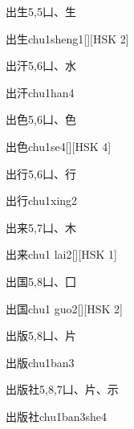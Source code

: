 \begin{entry}{出生}{5,5}{⼐、⽣}
  \begin{phonetics}{出生}{chu1sheng1}[][HSK 2]
  \end{phonetics}
\end{entry}

\begin{entry}{出汗}{5,6}{⼐、⽔}
  \begin{phonetics}{出汗}{chu1han4}
  \end{phonetics}
\end{entry}

\begin{entry}{出色}{5,6}{⼐、⾊}
  \begin{phonetics}{出色}{chu1se4}[][HSK 4]
  \end{phonetics}
\end{entry}

\begin{entry}{出行}{5,6}{⼐、⾏}
  \begin{phonetics}{出行}{chu1xing2}
  \end{phonetics}
\end{entry}

\begin{entry}{出来}{5,7}{⼐、⽊}
  \begin{phonetics}{出来}{chu1 lai2}[][HSK 1]
  \end{phonetics}
\end{entry}

\begin{entry}{出国}{5,8}{⼐、⼞}
  \begin{phonetics}{出国}{chu1 guo2}[][HSK 2]
  \end{phonetics}
\end{entry}

\begin{entry}{出版}{5,8}{⼐、⽚}
  \begin{phonetics}{出版}{chu1ban3}
  \end{phonetics}
\end{entry}

\begin{entry}{出版社}{5,8,7}{⼐、⽚、⽰}
  \begin{phonetics}{出版社}{chu1ban3she4}
  \end{phonetics}
\end{entry}

